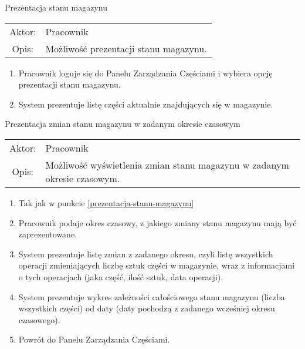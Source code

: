   \item Prezentacja stanu magazynu \label{prezentacja-stanu-magazynu} \\
  \begin{tabularx}{\linewidth}{ c X }
  Aktor: & Pracownik \\
  Opis: & Możliwość prezentacji stanu magazynu.\\
  \end{tabularx}
   \begin{enumerate}
    \item Pracownik loguje się do Panelu Zarządzania Częściami i wybiera opcję prezentacji stanu magazynu.
    \item System prezentuje listę części aktualnie znajdujących się w magazynie.
  \end{enumerate}
  
  \item Prezentacja zmian stanu magazynu w zadanym okresie czasowym \\
  \begin{tabularx}{\linewidth}{ c X }
  Aktor: & Pracownik \\
  Opis: & Możliwość wyświetlenia zmian stanu magazynu w zadanym okresie czasowym.\\
  \end{tabularx}
   \begin{enumerate}
    \item Tak jak w punkcie \ref{prezentacja-stanu-magazynu}
    \item Pracownik podaje okres czasowy, z jakiego zmiany stanu magazynu mają być zaprezentowane.
    \item System prezentuje listę zmian z zadanego okresu, czyli listę wszystkich operacji zmieniających liczbę sztuk części w magazynie, wraz z informacjami o tych operacjach (jaka część, ilość sztuk, data operacji).
    \item System prezentuje wykres zależności całościowego stanu magazynu (liczba wszystkich części) od daty (daty pochodzą z zadanego wcześniej okresu czasowego).
    \item Powrót do Panelu Zarządzania Częściami.
  \end{enumerate}
  
